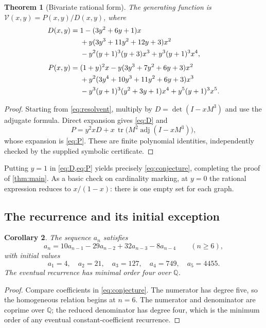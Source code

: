 \documentclass[11pt,a4paper]{article}
\newtheorem{theorem}{Theorem}[section]
\newtheorem{corollary}[theorem]{Corollary}
\theoremstyle{definition}
\newcommand{\Q}{\mathbb Q}
\newcommand{\tr}{\operatorname{tr}}
\newcommand{\V}{\mathcal V}
\begin{document}
\begin{theorem}[Bivariate rational form]
\label{thm:bivariate}
The generating function is $\V(x,y)=P(x,y)/D(x,y)$, where
\begin{align}
D(x,y)={}&1-(3y^2+6y+1)x\notag\\
 &+y(3y^3+11y^2+12y+3)x^2\notag\\
 &-y^2(y+1)^3(y+3)x^3+y^3(y+1)^3x^4,
 \label{eq:D}\\[3pt]
P(x,y)={}&(1+y)^2x-y(3y^3+7y^2+6y+3)x^2\notag\\
 &+y^2(3y^4+10y^3+11y^2+6y+3)x^3\notag\\
 &-y^3(y+1)^3(y^2+3y+1)x^4+y^5(y+1)^3x^5.
 \label{eq:P}
\end{align}
\end{theorem}

\begin{proof}
Starting from \cref{eq:resolvent}, multiply by
$D=\det(I-xM^3)$ and use the adjugate formula. Direct expansion gives
\cref{eq:D} and
\[
 P=y^2xD+x\,\tr\bigl(M^2\operatorname{adj}(I-xM^3)\bigr),
\]
whose expansion is \cref{eq:P}. These are finite polynomial identities,
independently checked by the supplied symbolic certificate.
\end{proof}

Putting $y=1$ in \cref{eq:D,eq:P} yields precisely
\cref{eq:conjecture}, completing the proof of \cref{thm:main}.
As a basic check on cardinality marking, at $y=0$ the rational expression
reduces to $x/(1-x)$: there is one empty set for each graph.

\subsection{The recurrence and its initial exception}

\begin{corollary}
\label{cor:recurrence}
The sequence $a_n$ satisfies
\begin{equation}
 a_n=10a_{n-1}-29a_{n-2}+32a_{n-3}-8a_{n-4}
 \qquad(n\ge6),
 \label{eq:recurrence}
\end{equation}
with initial values
\[
 a_1=4,\quad a_2=21,\quad a_3=127,\quad a_4=749,\quad a_5=4455.
\]
The eventual recurrence has minimal order four over $\Q$.
\end{corollary}

\begin{proof}
Compare coefficients in \cref{eq:conjecture}. The numerator has degree five,
so the homogeneous relation begins at $n=6$. The numerator and denominator
are coprime over $\Q$; the reduced denominator has degree four, which is
the minimum order of any eventual constant-coefficient recurrence.
\end{proof}
\end{document}
